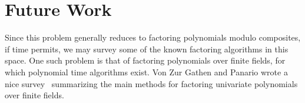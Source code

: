 \documentclass[letterpaper,twocolumn,10pt]{article}
\begin{document}
\section{Future Work}

Since this problem generally reduces to factoring polynomials modulo composites, if time permits, we may survey some of the known factoring algorithms in this space. One such problem is that of factoring polynomials over finite fields, for which polynomial time algorithms exist. Von Zur Gathen and Panario wrote a nice survey~\cite{Gathen} summarizing the main methods for factoring univariate polynomials over finite fields. 



{\footnotesize 
}


\end{document}
